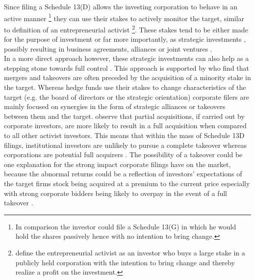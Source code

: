 \documentclass[12pt]{article}
\begin{document}
Since filing a Schedule 13(D) allows the investing corporation to behave in an active manner \footnote{In comparison the investor could file a Schedule 13(G) in which he would hold the shares passively hence with no intention to bring change.} \citep{Brigida2012} they can use their stakes to actively monitor the target, similar to \citet{Klein2009} definition of an entrepreneurial activist \footnote{\citet{Klein2009} define the entrepreneurial activist as an investor who buys a large stake in a publicly held corporation with the intention to bring change and thereby realize a profit on the investment.}.
These stakes tend to be either made for the purpose of investment or far more importantly, as strategic investments \citep{Damodaran2005}, possibly resulting in business agreements, alliances or joint ventures \citep{Allen2000}. \\
In a more direct approach however, these strategic investments can also help as a stepping stone towards full control \citep{Huang2017}. 
This approach is supported by \citet{Goldman2005} who find that mergers and takeovers are often preceded by the acquisition of a minority stake in the target. Whereas hedge funds use their stakes to change characteristics of the target (e.g. the board of directors or the strategic orientation) \citep{Klein2009} corporate filers are mainly focused on synergies in the form of strategic alliances or takeovers between them and the target. \citet{Akhigbe2007} observe that partial acquisitions, if carried out by corporate investors, are more likely to result in a full acquisition when compared to all other activist investors. This means that within the mass of Schedule 13D filings, institutional investors are unlikely to pursue a complete takeover whereas corporations are potential full acquirers \citep{Brigida2012}. The possibility of a takeover could be one explanation for the strong impact corporate filings have on the market, because the abnormal returns could be a reflection of investors' expectations of the target firms stock being acquired at a premium to the current price \citep{Goldman2005} especially with strong corporate bidders being likely to overpay in the event of a full takeover \citep{Akhigbe2007}.
\end{document}
